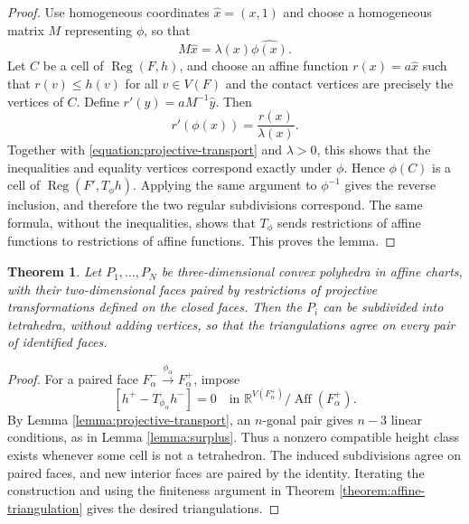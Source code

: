 \documentclass[oneside,a4paper,12pt]{article}
\newcommand{\R}{\mathbb R}
\newcommand{\Aff}{\operatorname{Aff}}
\newcommand{\Reg}{\operatorname{Reg}}
\theoremstyle{plain}
\newtheorem{theorem}{Theorem}[section]
\theoremstyle{definition}
\theoremstyle{remark}
\numberwithin{equation}{section}
\begin{document}
\begin{proof}
Use homogeneous coordinates $\widehat x=(x,1)$ and choose a homogeneous matrix $M$ representing $\phi$, so that
\begin{equation}
M\widehat x=\lambda(x)\widehat{\phi(x)}.
  \nonumber \end{equation}
Let $C$ be a cell of $\Reg(F,h)$, and choose an affine function $r(x)=a\widehat x$ such that $r(v)\leq h(v)$ for all $v\in V(F)$ and the contact vertices are precisely the vertices of $C$. Define $r'(y)=aM^{-1}\widehat y$. Then
\begin{equation}
r'(\phi(x))=\frac{r(x)}{\lambda(x)}.
  \nonumber \end{equation}
Together with \eqref{equation:projective-transport} and $\lambda>0$, this shows that the inequalities and equality vertices correspond exactly under $\phi$. Hence $\phi(C)$ is a cell of $\Reg(F',T_\phi h)$. Applying the same argument to $\phi^{-1}$ gives the reverse inclusion, and therefore the two regular subdivisions correspond. The same formula, without the inequalities, shows that $T_\phi$ sends restrictions of affine functions to restrictions of affine functions. This proves the lemma.
\end{proof}

\begin{theorem}\label{theorem:projective-triangulation}
Let $P_1,\ldots,P_N$ be three-dimensional convex polyhedra in affine charts, with their two-dimensional faces paired by restrictions of projective transformations defined on the closed faces. Then the $P_i$ can be subdivided into tetrahedra, without adding vertices, so that the triangulations agree on every pair of identified faces.
\end{theorem}

\begin{proof}
For a paired face $F^-_\alpha\xrightarrow{\phi_\alpha}F^+_\alpha$, impose
\begin{equation}
\left[h^+ -T_{\phi_\alpha}h^-\right]=0
\quad\text{in }\R^{V(F^+_\alpha)}/\Aff(F^+_\alpha).
  \nonumber \end{equation}
By Lemma \ref{lemma:projective-transport}, an $n$-gonal pair gives $n-3$ linear conditions, as in Lemma \ref{lemma:surplus}. Thus a nonzero compatible height class exists whenever some cell is not a tetrahedron. The induced subdivisions agree on paired faces, and new interior faces are paired by the identity. Iterating the construction and using the finiteness argument in Theorem \ref{theorem:affine-triangulation} gives the desired triangulations.
\end{proof}
\end{document}
